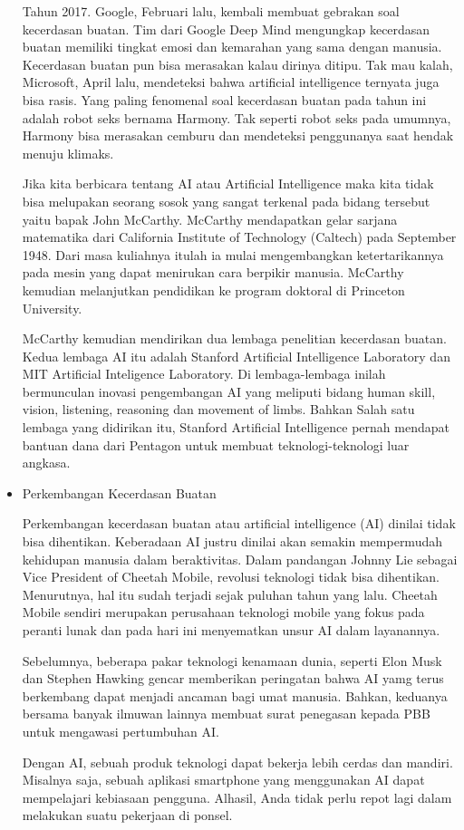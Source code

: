 \begin{itemize}
\par Tahun 2017. Google, Februari lalu, kembali membuat gebrakan soal kecerdasan buatan. Tim dari Google Deep Mind mengungkap kecerdasan buatan memiliki tingkat emosi dan kemarahan yang sama dengan manusia. Kecerdasan buatan pun bisa merasakan kalau dirinya ditipu. Tak mau kalah, Microsoft, April lalu, mendeteksi bahwa artificial intelligence ternyata juga bisa rasis.
Yang paling fenomenal soal kecerdasan buatan pada tahun ini adalah robot seks bernama Harmony. Tak seperti robot seks pada umumnya, Harmony bisa merasakan cemburu dan mendeteksi penggunanya saat hendak menuju klimaks.
\par Jika kita berbicara tentang AI atau Artificial Intelligence maka kita tidak bisa melupakan seorang sosok yang sangat terkenal pada bidang tersebut yaitu bapak John McCarthy.
McCarthy mendapatkan gelar sarjana matematika dari California Institute of Technology (Caltech) pada September 1948. Dari masa kuliahnya itulah ia mulai mengembangkan ketertarikannya pada mesin yang dapat menirukan cara berpikir manusia. McCarthy kemudian melanjutkan pendidikan ke program doktoral di Princeton University.
\par McCarthy kemudian mendirikan dua lembaga penelitian kecerdasan buatan. Kedua lembaga AI itu adalah Stanford Artificial Intelligence Laboratory dan MIT Artificial Inteligence Laboratory. Di lembaga-lembaga inilah bermunculan inovasi pengembangan AI yang meliputi bidang human skill, vision, listening, reasoning dan movement of limbs. Bahkan Salah satu lembaga yang didirikan itu, Stanford Artificial Intelligence pernah mendapat bantuan dana dari Pentagon untuk membuat teknologi-teknologi luar angkasa.

\item Perkembangan Kecerdasan Buatan
\par Perkembangan kecerdasan buatan atau artificial intelligence (AI) dinilai tidak bisa dihentikan. Keberadaan AI justru dinilai akan semakin mempermudah kehidupan manusia dalam beraktivitas. Dalam pandangan Johnny Lie sebagai Vice President of Cheetah Mobile, revolusi teknologi tidak bisa dihentikan. Menurutnya, hal itu sudah terjadi sejak puluhan tahun yang lalu. Cheetah Mobile sendiri merupakan perusahaan teknologi mobile yang fokus pada peranti lunak dan pada hari ini menyematkan unsur AI dalam layanannya.
\par Sebelumnya, beberapa pakar teknologi kenamaan dunia, seperti Elon Musk dan Stephen Hawking gencar memberikan peringatan bahwa AI yamg terus berkembang dapat menjadi ancaman bagi umat manusia. Bahkan, keduanya bersama banyak ilmuwan lainnya membuat surat penegasan kepada PBB untuk mengawasi pertumbuhan AI.
\par Dengan AI, sebuah produk teknologi dapat bekerja lebih cerdas dan mandiri. Misalnya saja, sebuah aplikasi smartphone yang menggunakan AI dapat mempelajari kebiasaan pengguna. Alhasil, Anda tidak perlu repot lagi dalam melakukan suatu pekerjaan di ponsel.
\end{itemize}
